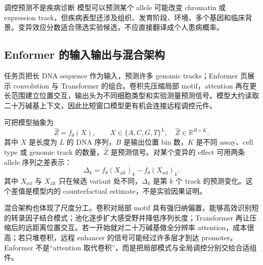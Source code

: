 

\begin{warningbox}{调控预测不是疾病诊断}
模型可以预测某个 allele 可能改变 chromatin 或 expression track，但疾病表型还涉及组织、发育阶段、环境、多个基因和临床背景。变异效应分数适合筛选实验候选，不应直接翻译成个人患病概率。
\end{warningbox}

\subsection{Enformer 的输入输出与混合架构}

任务页把长 DNA sequence 作为输入，预测许多 genomic tracks；Enformer 页展示 convolution 与 Transformer 的组合。卷积先压缩局部 motif，attention 再在更长范围建立位置交互，输出头为不同细胞类型和实验测量预测信号。模型大约读取二十万碱基上下文，因此比短窗口模型更有机会连接远程调控元件。



可把模型抽象为
$$
\hat Z=f_{\theta}(X),\qquad
X\in\{A,C,G,T\}^{L},\quad
\hat Z\in\mathbb{R}^{B\times K}.
$$
其中 $X$ 是长度为 $L$ 的 DNA 序列，$B$ 是输出位置 bin 数，$K$ 是不同 assay、cell type 或 genomic track 的数量，$\hat Z$ 是预测信号。对某个变异的 effect 可用两条 allele 序列之差表示：
$$
\Delta_k=f_{\theta}(X_{\text{alt}})_k-f_{\theta}(X_{\text{ref}})_k.
$$
其中 $X_{\text{ref}}$ 与 $X_{\text{alt}}$ 只在候选 variant 处不同，$\Delta_k$ 是第 $k$ 个 track 的预测变化。这个差值是模型内的 counterfactual estimate，不是实验因果证明。

混合架构也体现了尺度分工。卷积对局部 motif 具有强归纳偏置，能够高效识别短的转录因子结合模式；池化逐步扩大感受野并降低序列长度；Transformer 再让压缩后的远距离位置交互。若一开始就对二十万碱基做全分辨率 attention，成本很高；若只堆卷积，远程 enhancer 的信号可能经过许多层才到达 promoter。Enformer 不是“attention 取代卷积”，而是把局部模式与全局调控分别交给合适组件。

